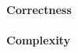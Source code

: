 \documentclass{article}
\begin{document}
\paragraph{Correctness}


\paragraph{Complexity}
\end{document}

